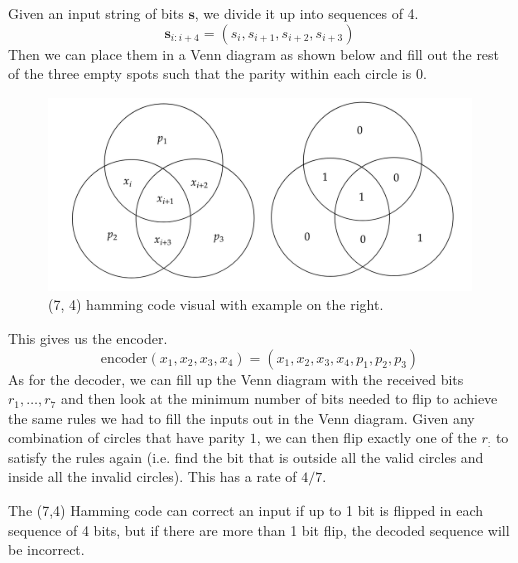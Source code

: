 \documentclass{article}
\begin{document}
    \begin{definition}
      Given an input string of bits $\mathbf{s}$, we divide it up into sequences of 4. 
      \begin{equation}
        \mathbf{s}_{i:i+4} = (s_i, s_{i+1}, s_{i+2}, s_{i+3})
      \end{equation}
      Then we can place them in a Venn diagram as shown below and fill out the rest of the three empty spots such that the parity within each circle is $0$. 
      \begin{figure}[H]
        \centering 
        \includegraphics[scale=0.25]{img/hamming_74.png}
        \caption{(7, 4) hamming code visual with example on the right. } 
        \label{fig:hamming_74}
      \end{figure}
      This gives us the encoder. 
      \begin{equation}
        \mathrm{encoder}(x_1, x_2, x_3, x_4) = (x_1, x_2, x_3, x_4, p_1, p_2, p_3)
      \end{equation}
      As for the decoder, we can fill up the Venn diagram with the received bits $r_1, \ldots, r_7$ and then look at the minimum number of bits needed to flip to achieve the same rules we had to fill the inputs out in the Venn diagram. Given any combination of circles that have parity $1$, we can then flip exactly one of the $r_{:}$ to satisfy the rules again (i.e. find the bit that is outside all the valid circles and inside all the invalid circles). This has a rate of $4/7$. 
    \end{definition}

    \begin{theorem}
      The (7,4) Hamming code can correct an input if up to 1 bit is flipped in each sequence of 4 bits, but if there are more than 1 bit flip, the decoded sequence will be incorrect. 
    \end{theorem}
\end{document}
